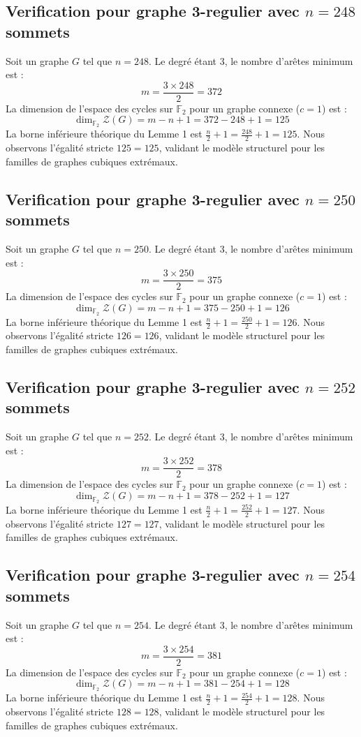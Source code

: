 \documentclass[11pt,a4paper]{article}
\begin{document}
\subsection{Verification pour graphe 3-regulier avec $n=248$ sommets}
Soit un graphe $G$ tel que $n = 248$. Le degré étant 3, le nombre d'arêtes minimum est :
$$ m = \frac{3 \times 248}{2} = 372 $$
La dimension de l'espace des cycles sur $\mathbb{F}_2$ pour un graphe connexe ($c=1$) est :
$$ \dim_{\mathbb{F}_2} \mathcal{Z}(G) = m - n + 1 = 372 - 248 + 1 = 125 $$
La borne inférieure théorique du Lemme 1 est $\frac{n}{2} + 1 = \frac{248}{2} + 1 = 125$.
Nous observons l'égalité stricte $125 = 125$, validant le modèle structurel pour les familles de graphes cubiques extrémaux.

\subsection{Verification pour graphe 3-regulier avec $n=250$ sommets}
Soit un graphe $G$ tel que $n = 250$. Le degré étant 3, le nombre d'arêtes minimum est :
$$ m = \frac{3 \times 250}{2} = 375 $$
La dimension de l'espace des cycles sur $\mathbb{F}_2$ pour un graphe connexe ($c=1$) est :
$$ \dim_{\mathbb{F}_2} \mathcal{Z}(G) = m - n + 1 = 375 - 250 + 1 = 126 $$
La borne inférieure théorique du Lemme 1 est $\frac{n}{2} + 1 = \frac{250}{2} + 1 = 126$.
Nous observons l'égalité stricte $126 = 126$, validant le modèle structurel pour les familles de graphes cubiques extrémaux.

\subsection{Verification pour graphe 3-regulier avec $n=252$ sommets}
Soit un graphe $G$ tel que $n = 252$. Le degré étant 3, le nombre d'arêtes minimum est :
$$ m = \frac{3 \times 252}{2} = 378 $$
La dimension de l'espace des cycles sur $\mathbb{F}_2$ pour un graphe connexe ($c=1$) est :
$$ \dim_{\mathbb{F}_2} \mathcal{Z}(G) = m - n + 1 = 378 - 252 + 1 = 127 $$
La borne inférieure théorique du Lemme 1 est $\frac{n}{2} + 1 = \frac{252}{2} + 1 = 127$.
Nous observons l'égalité stricte $127 = 127$, validant le modèle structurel pour les familles de graphes cubiques extrémaux.

\subsection{Verification pour graphe 3-regulier avec $n=254$ sommets}
Soit un graphe $G$ tel que $n = 254$. Le degré étant 3, le nombre d'arêtes minimum est :
$$ m = \frac{3 \times 254}{2} = 381 $$
La dimension de l'espace des cycles sur $\mathbb{F}_2$ pour un graphe connexe ($c=1$) est :
$$ \dim_{\mathbb{F}_2} \mathcal{Z}(G) = m - n + 1 = 381 - 254 + 1 = 128 $$
La borne inférieure théorique du Lemme 1 est $\frac{n}{2} + 1 = \frac{254}{2} + 1 = 128$.
Nous observons l'égalité stricte $128 = 128$, validant le modèle structurel pour les familles de graphes cubiques extrémaux.
\end{document}
